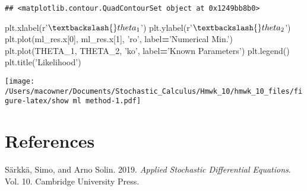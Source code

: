 \documentclass[]{article}
\newenvironment{Shaded}{\begin{snugshade}}{\end{snugshade}}
\newcommand{\DecValTok}[1]{\textcolor[rgb]{0.00,0.00,0.81}{#1}}
\newcommand{\NormalTok}[1]{#1}
\newcommand{\OperatorTok}[1]{\textcolor[rgb]{0.81,0.36,0.00}{\textbf{#1}}}
\newcommand{\StringTok}[1]{\textcolor[rgb]{0.31,0.60,0.02}{#1}}
\newcommand{\VerbatimStringTok}[1]{\textcolor[rgb]{0.31,0.60,0.02}{#1}}
\begin{document}
\begin{verbatim}
## <matplotlib.contour.QuadContourSet object at 0x1249bb8b0>
\end{verbatim}

\begin{Shaded}
\begin{Highlighting}[]
\NormalTok{plt.xlabel(}\VerbatimStringTok{r'$\textbackslash{}theta_1$'}\NormalTok{)}
\NormalTok{plt.ylabel(}\VerbatimStringTok{r'$\textbackslash{}theta_2$'}\NormalTok{)}
\NormalTok{plt.plot(ml_res.x[}\DecValTok{0}\NormalTok{], ml_res.x[}\DecValTok{1}\NormalTok{], }\StringTok{'ro'}\NormalTok{, label}\OperatorTok{=}\StringTok{'Numerical Min.'}\NormalTok{)}
\NormalTok{plt.plot(THETA_1, THETA_2, }\StringTok{'ko'}\NormalTok{, label}\OperatorTok{=}\StringTok{'Known Parameters'}\NormalTok{)}
\NormalTok{plt.legend()}
\NormalTok{plt.title(}\StringTok{'Likelihood'}\NormalTok{)}
\end{Highlighting}
\end{Shaded}

\texttt{[image: /Users/macowner/Documents/Stochastic\_Calculus/Hmwk\_10/hmwk\_10\_files/figure-latex/show ml method-1.pdf]}

\hypertarget{references}{%
\section*{References}\label{references}}

\hypertarget{refs}{}
\leavevmode\hypertarget{ref-sarkka2019applied}{}%
Särkkä, Simo, and Arno Solin. 2019. \emph{Applied Stochastic
Differential Equations}. Vol. 10. Cambridge University Press.
\end{document}
